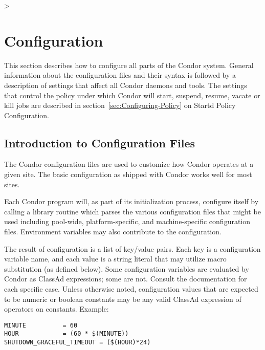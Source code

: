 >%
\section{\label{sec:Configuring-Condor}Configuration}


This section describes how to configure all parts of the Condor
system.  General information about the configuration
files and their syntax is followed by a description of
settings that affect all
Condor daemons and tools.
The 
settings that control the policy under which Condor will start,
suspend, resume, vacate or kill jobs
are described in 
section~\ref{sec:Configuring-Policy} on Startd Policy Configuration. 

\subsection{\label{sec:Intro-to-Config-Files}Introduction to
Configuration Files} 

The Condor configuration files are used to customize how Condor
operates at a given site.  The basic configuration as shipped with
Condor works well for most sites.

Each Condor program will, as part of its initialization process,
configure itself by calling a library routine which parses the
various configuration files that might be used including pool-wide,
platform-specific, and machine-specific configuration files.
Environment variables may also contribute to the configuration.

The result of configuration is a list of key/value pairs.
Each key is a configuration variable name,
and each value is a string literal
that may utilize macro substitution (as defined below).
Some configuration variables are evaluated by Condor as ClassAd
expressions; some are not.  Consult the documentation for each specific
case.  Unless otherwise noted, configuration values that are expected
to be numeric or boolean constants may be any valid ClassAd expression
of operators on constants.  Example:

\begin{verbatim}
MINUTE          = 60
HOUR            = (60 * $(MINUTE))
SHUTDOWN_GRACEFUL_TIMEOUT = ($(HOUR)*24)
\end{verbatim}

